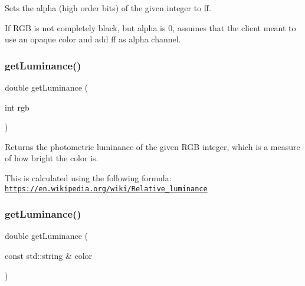 Sets the \textquotesingle{}alpha\textquotesingle{} (high order bits) of the given integer to ff. 

If R\+GB is not completely black, but alpha is 0, assumes that the client meant to use an opaque color and add ff as alpha channel. \mbox{\label{classsgl_1_1GColor_abf11afacb5154dec7b8c4ba82ae4cb05}} 
\subsubsection{\texorpdfstring{get\+Luminance()}{getLuminance()}\hspace{0.1cm}{\footnotesize\ttfamily [1/2]}}
{\footnotesize\ttfamily double get\+Luminance (\begin{DoxyParamCaption}\item[{int}]{rgb }\end{DoxyParamCaption})\hspace{0.3cm}{\ttfamily [static]}}



Returns the photometric luminance of the given R\+GB integer, which is a measure of how bright the color is. 

This is calculated using the following formula\+: \href{https://en.wikipedia.org/wiki/Relative_luminance}{\tt https\+://en.\+wikipedia.\+org/wiki/\+Relative\+\_\+luminance} \mbox{\label{classsgl_1_1GColor_a677f43c53c7f2f5c5294cc23241cc9a7}} 
\subsubsection{\texorpdfstring{get\+Luminance()}{getLuminance()}\hspace{0.1cm}{\footnotesize\ttfamily [2/2]}}
{\footnotesize\ttfamily double get\+Luminance (\begin{DoxyParamCaption}\item[{const std\+::string \&}]{color }\end{DoxyParamCaption})\hspace{0.3cm}{\ttfamily [static]}}



